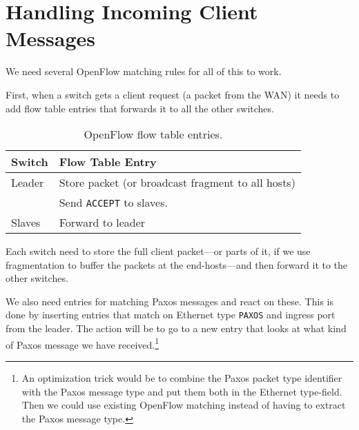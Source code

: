 \section{Handling Incoming Client Messages}
\label{chapter:incoming.client}

We need several OpenFlow matching rules for all of this to work.

First, when a switch gets a client request (a packet from the
\acs{WAN}) it needs
to add flow table entries that forwards it to all the other switches.

\begin{table}[H]
  \centering
  \begin{tabular}{|l|l|}
    \hline
      \textbf{Switch} &
      \textbf{Flow Table Entry} \\

    \hline
      Leader & Store packet (or broadcast fragment to all hosts) \\
             & Send \texttt{ACCEPT} to slaves. \\

    \hline
      Slaves & Forward to leader \\

    \hline
  \end{tabular}

  \caption{OpenFlow flow table entries.}
  \label{table:paxos.flowtable.entries}
\end{table}

Each switch need to store the full client packet---or parts of it, if we
use fragmentation to buffer the packets at the
end-hosts---and then forward
it to the other switches.

We also need entries for matching Paxos messages and react on these.
This is done by inserting entries that match on Ethernet type
\texttt{PAXOS} and ingress port from the leader.
The action will be to go to a new entry that looks at what kind of Paxos
message we have received.\footnote{An optimization trick would be to
combine the Paxos packet type identifier with the Paxos message type and put
them both in the Ethernet type-field.  Then we could use existing OpenFlow
matching instead of having to extract the Paxos message type.}

